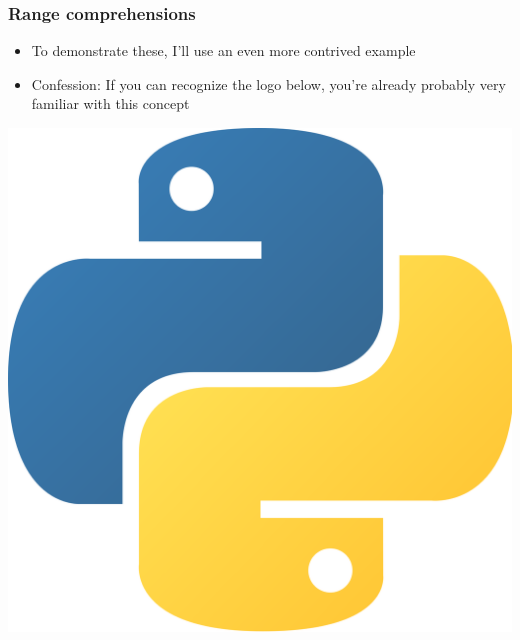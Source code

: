 \documentclass{beamer}
\begin{document}
\begin{frame}
\frametitle{Range comprehensions}
\begin{itemize}
\setlength\itemsep{2em}
\item To demonstrate these, I'll use an even more contrived example

\item Confession: If you can recognize the logo below, you're already probably very familiar with this concept
\end{itemize}
\vspace{2em}
\begin{center}
\includegraphics[scale=0.03]{python.png}
\end{center}
\end{frame}

\end{document}
